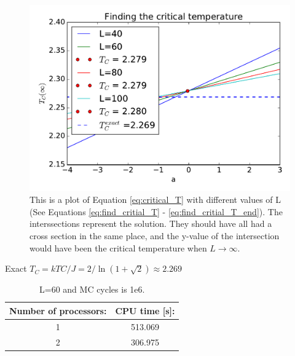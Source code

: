 \begin{figure}[H]
\includegraphics[width=\linewidth]{../results/4f/critical_t}\caption{This is a plot of Equation \ref{eq:critical_T} with different values of L (See Equations \ref{eq:find_critial_T} - \ref{eq:find_critial_T_end}). The interssections represent the solution. They should have all had a cross section in the same place, and the y-value of the intersection would have been the critical temperature when $L \rightarrow \infty$.}\label{fig:critical_T}
\end{figure}

Exact $T_C =  kTC/J = 2/ \ln(1+\sqrt{
2}) \approx 2.269$ \cite{Onsager}

\begin{table}\caption{L=60 and MC cycles is 1e6.}
\begin{tabular}{cc}
Number of processors:& CPU time [s]: \\ \hline
 1 & 513.069\\
 2 & 306.975\\
\end{tabular}
\end{table}